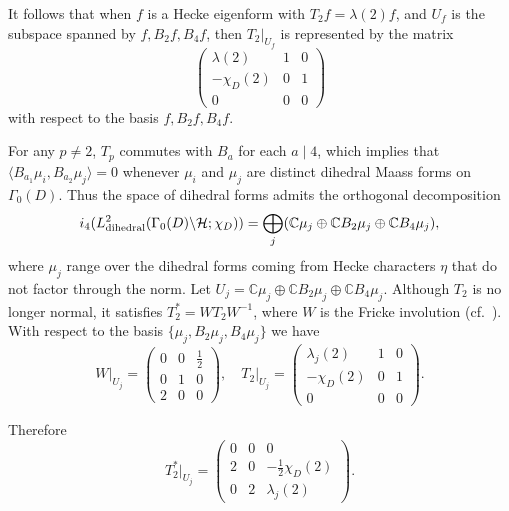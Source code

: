 \documentclass[11pt,reqno,oneside]{amsart}
\theoremstyle{plain}
\theoremstyle{definition}
\newcommand{\C}{\mathbb{C}}
\newcommand{\calH}{\mathcal{H}}
\begin{document}
It follows that when $f$ is a Hecke eigenform with $T_2 f = \lambda(2) f$,
and $U_f$ is the subspace spanned by $f, B_2 f, B_4 f$, then $T_2 \vert_{U_f}$
is represented by the matrix
\[
  \begin{pmatrix}
    \lambda(2) & 1 & 0 \\
    -\chi_D(2) & 0 & 1 \\
    0          & 0 & 0
  \end{pmatrix}
\]
with respect to the basis $f, B_2 f, B_4 f$.

For any $p \ne 2$, $T_p$ commutes with $B_a$ for each $a \mid 4$, which implies
that $\langle B_{a_1} \mu_i, B_{a_2} \mu_j \rangle = 0$ whenever $\mu_i$ and
$\mu_j$ are distinct dihedral Maass forms on $\Gamma_0(D)$.
Thus the space of dihedral forms admits the orthogonal decomposition
\[
  i_4(L_{\textup{dihedral}}^2(\Gamma_0(D) \backslash \calH; \chi_D))
  =
  \bigoplus_{j} (\C \mu_j \oplus \C B_2 \mu_j \oplus \C B_4 \mu_j),
\]
where $\mu_j$ range over the dihedral forms coming from Hecke characters $\eta$
that do not factor through the norm.
Let $U_j = \C \mu_j \oplus \C B_2 \mu_j \oplus \C B_4 \mu_j$.
Although $T_2$ is no longer normal, it satisfies $T_2^* = W T_2 W^{-1}$, where
$W$ is the Fricke involution (cf.~\cite[\S6]{dfi}).
With respect to the basis $\{\mu_j, B_2 \mu_j, B_4 \mu_j \}$ we have
\[
  W \vert_{U_j} = \begin{pmatrix}
    0 & 0 & \frac{1}{2} \\
    0 & 1 & 0           \\
    2 & 0 & 0
  \end{pmatrix},
  \quad
  T_2 \vert_{U_j} = \begin{pmatrix}
    \lambda_j(2) & 1 & 0 \\
    -\chi_D(2)   & 0 & 1 \\
    0            & 0 & 0
  \end{pmatrix}.
\]

Therefore
\[
  T_2^* \vert_{U_j} = \begin{pmatrix}
    0 & 0 & 0                      \\
    2 & 0 & -\frac{1}{2} \chi_D(2) \\
    0 & 2 & \lambda_j(2)
  \end{pmatrix}.
\]
\end{document}
